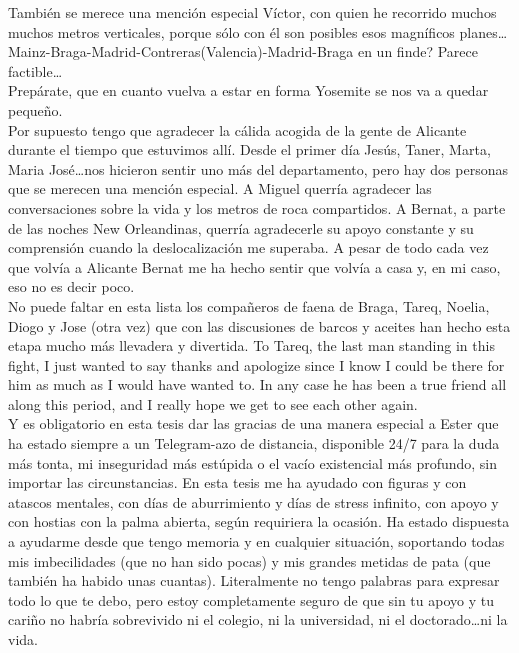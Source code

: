 También se merece una mención especial Víctor, con quien he recorrido muchos muchos metros verticales, porque sólo con él son posibles esos magníficos planes\dots\\
Mainz-Braga-Madrid-Contreras(Valencia)-Madrid-Braga en un finde? Parece factible\dots\\
Prepárate, que en cuanto vuelva a estar en forma Yosemite se nos va a quedar pequeño.\\


Por supuesto tengo que agradecer la cálida acogida de la gente de Alicante durante el tiempo que estuvimos allí. Desde el primer día Jesús, Taner, Marta, Maria José\dots nos hicieron sentir uno más del departamento, pero hay dos personas que se merecen una mención especial. A Miguel querría agradecer las conversaciones sobre la vida y los metros de roca compartidos. A Bernat, a parte de las noches New Orleandinas, querría agradecerle su apoyo constante y su comprensión cuando la deslocalización me superaba. A pesar de todo cada vez que volvía a Alicante Bernat me ha hecho sentir que volvía a casa y, en mi caso, eso no es decir poco.\\

No puede faltar en esta lista los compañeros de faena de Braga, Tareq, Noelia, Diogo y Jose (otra vez) que con las discusiones de barcos y aceites han hecho esta etapa mucho más llevadera y divertida. To Tareq, the last man standing in this fight, I just wanted to say thanks and apologize since I know I could be there for him as much as I would have wanted to. In any case he has been a true friend all along this period, and I really hope we get to see each other again.\\


Y es obligatorio en esta tesis dar las gracias de una manera especial a Ester que ha estado siempre a un Telegram-azo de distancia, disponible 24/7 para la duda más tonta, mi inseguridad más estúpida o el vacío existencial más profundo, sin importar las circunstancias. En esta tesis me ha ayudado con figuras y con atascos mentales, con días de aburrimiento y días de stress infinito, con apoyo y con hostias con la palma abierta, según requiriera la ocasión.
Ha estado dispuesta a ayudarme desde que tengo memoria y en cualquier situación, soportando todas mis imbecilidades (que no han sido pocas) y mis grandes metidas de pata (que también ha habido unas cuantas).
Literalmente no tengo palabras para expresar todo lo que te debo, pero estoy completamente seguro de que sin tu apoyo y tu cariño no habría sobrevivido ni el colegio, ni la universidad, ni el doctorado\dots ni la vida.\\


